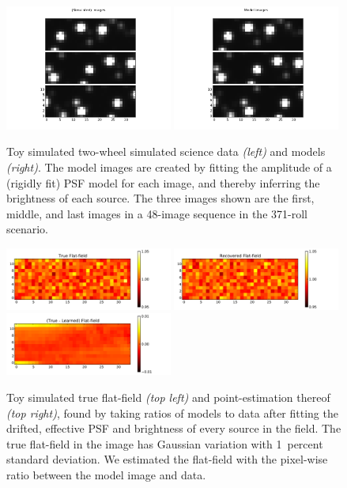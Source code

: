 \documentclass[letterpaper,12pt,whitepaper]{haastex}
\begin{document}
\begin{figure}
\includegraphics[trim=0.75in 0.5in 0.75in 0.5in, width=0.49\textwidth]{sim-103.png}%
\includegraphics[trim=0.75in 0.5in 0.75in 0.5in, width=0.49\textwidth]{sim-104.png}
\caption{Toy simulated two-wheel simulated science data \textsl{(left)} and models \textsl{(right)}.
The model images are created by fitting the amplitude of a (rigidly fit) PSF model for each image,
  and thereby inferring the brightness of each source.
The three images shown are the first, middle, and last images
  in a 48-image sequence in the 371-roll scenario.\label{fig:toydata}}
\end{figure}

\begin{figure}
\includegraphics[width=0.49\textwidth]{sim2-205}
\includegraphics[width=0.49\textwidth]{sim2-206}
\includegraphics[width=0.49\textwidth]{sim2-207}
\caption{Toy simulated true flat-field \textsl{(top left)} and point-estimation thereof \textsl{(top right)},
  found by taking ratios of models to data after fitting the drifted, effective PSF and brightness of every source in the field.
  The true flat-field in the image has Gaussian variation with 1~percent standard deviation.
  We estimated the flat-field with the pixel-wise ratio between the model image and data.\label{fig:toyflat}}
\end{figure}
\end{document}
